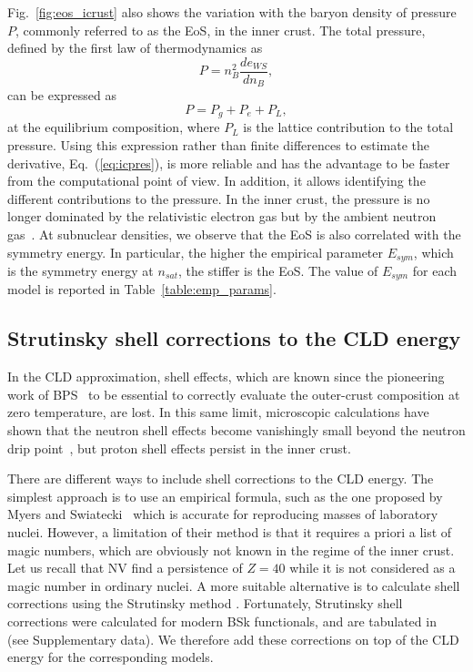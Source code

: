 Fig.~\ref{fig:eos_icrust} also shows the variation with the 
baryon density of pressure $P$, commonly referred to as the EoS, in the inner
crust. The total pressure, defined by the first law of thermodynamics as
%
\begin{equation}
  P = {n_B^2}\frac{de_{WS}}{dn_B},\label{eq:icpres}
\end{equation}
%
can be expressed as~\cite{BBP}
%
\begin{equation}
  P = P_g + P_e + P_L,
\end{equation}
%
at the equilibrium composition,
where $P_L$ is the lattice contribution to the total pressure. Using this
expression rather than finite differences to estimate the derivative,
Eq.~(\ref{eq:icpres}), is more reliable and has the advantage to be faster from the
computational point of view. In addition, it allows identifying the different
contributions to the pressure. In the inner crust, the pressure is no longer 
dominated by the relativistic electron gas but by the ambient neutron 
gas~\cite{Carreau2017}. At subnuclear densities, we observe that the EoS is 
also correlated with the symmetry energy. In particular, the higher the 
empirical parameter $E_{sym}$, which is the symmetry energy at $n_{sat}$, the 
stiffer is the EoS. The value of $E_{sym}$ for each model is reported in
Table~\ref{table:emp_params}.

\subsection{Strutinsky shell corrections to the CLD
energy}\label{subsec:strutinsky}

In the CLD approximation, shell effects, which are known since the pioneering 
work of BPS~\cite{BPS} to be essential to correctly evaluate the outer-crust
composition at zero temperature, are lost.
In this same limit, microscopic calculations have shown that the neutron 
shell effects become vanishingly small beyond the neutron drip 
point~\cite{Chamel2006,Chamel2007}, but proton shell effects 
persist in the inner crust.

There are different ways to include shell corrections to the CLD energy. The
simplest approach is to use an empirical formula, such as the one proposed
by Myers and Swiatecki~\cite{Myers1966} which is accurate for reproducing
masses of laboratory nuclei. 
However, a limitation of their method 
is that it requires a priori a list of magic numbers, which are obviously not
known in the regime of the inner crust. Let us recall that NV find a
persistence of $Z=40$ while it is not considered as a magic number in ordinary
nuclei. 
A more suitable alternative is to calculate shell corrections using the
Strutinsky method \cite{Onsi2008}. 
{Fortunately}, Strutinsky shell corrections {were} calculated 
for modern BSk functionals, and are tabulated in~\cite{Pearson2018} (see
Supplementary data). We therefore add these corrections on top of the CLD 
energy for the corresponding models.

